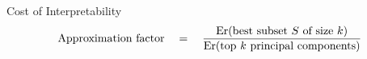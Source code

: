 \documentclass{beamer}
\begin{document}
\begin{frame}
\begin{columns}
\begin{column}{0.5\textwidth}
\begin{center}
    \end{center}
  \end{column}
\end{columns}
\vspace{5mm}


\begin{block}{Cost of Interpretability}
  \vspace{-4mm}
  \begin{align*}
  \text{Approximation factor}\quad=\quad
  \frac{\mathrm{Er}(\text{best subset $S$ of size $k$})}{\mathrm{Er}(\text{top $k$
  principal components})}
  \end{align*}
  \end{block}
\end{frame}
\end{document}
